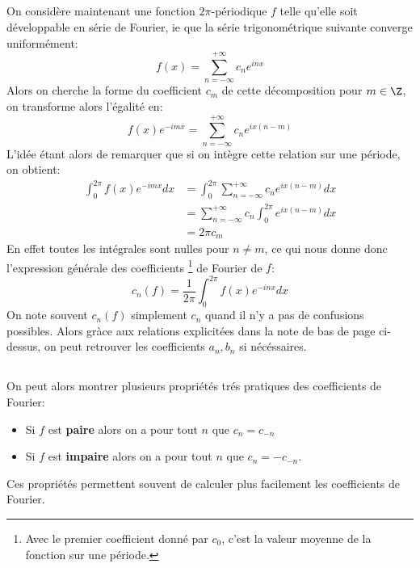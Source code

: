 \subsection*{}
On considère maintenant une fonction \(2\pi\)-périodique \(f\) telle qu'elle soit développable en série de Fourier, ie que la série trigonométrique suivante converge uniformément:
\[
   f(x) = \sum_{n = -\infty}^{+\infty} c_n e^{inx}   
\]
Alors on cherche la forme du coefficient \(c_m\) de cette décomposition pour \(m \in \Z\), on transforme alors l'égalité en:
\[
   f(x)e^{-imx} = \sum_{n = -\infty}^{+\infty} c_n e^{ix(n - m)}
\]
L'idée étant alors de remarquer que si on intègre cette relation sur une période, on obtient:
\begin{align*}
   \int_{0}^{2\pi} f(x)e^{-imx} d x &= \int_{0}^{2\pi} \sum_{n = -\infty}^{+\infty} c_n e^{ix(n - m)} d x \\
   & = \sum_{n = -\infty}^{+\infty} c_n \int_{0}^{2\pi} e^{ix(n - m)} d x\\
   & = 2\pi c_m
\end{align*}
En effet toutes les intégrales sont nulles pour \(n \neq m\), ce qui nous donne donc l'expression générale des coefficients \footnote[1]{Avec le premier coefficient donné par \(c_0\), c'est la valeur moyenne de la fonction sur une période.} de Fourier de \(f\):
\[
   c_n(f) = \frac{1}{2\pi} \int_{0}^{2\pi} f(x)e^{-inx} d x
\]
On note souvent \(c_n(f)\) simplement \(c_n\) quand il n'y a pas de confusions possibles. Alors gràce aux relations explicitées dans la note de bas de page ci-dessus, on peut retrouver les coefficients \(a_n, b_n\) si nécéssaires.

\subsection*{}
On peut alors montrer plusieurs propriétés trés pratiques des coefficients de Fourier:
\begin{itemize}
   \item Si \(f\) est \textbf{paire} alors on a pour tout \(n\) que \(c_n = c_{-n}\)
   \item Si \(f\) est \textbf{impaire} alors on a pour tout \(n\) que \(c_n = -c_{-n}\).
\end{itemize}
Ces propriétés permettent souvent de calculer plus facilement les coefficients de Fourier.

